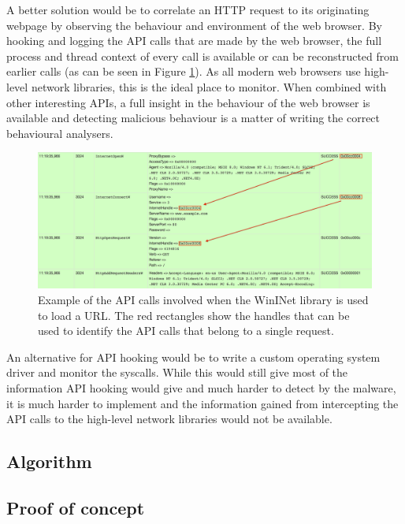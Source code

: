 A better solution would be to correlate an HTTP request to its originating webpage by observing the behaviour and environment of the web browser. By hooking and logging the API calls that are made by the web browser, the full process and thread context of every call is available or can be reconstructed from earlier calls (as can be seen in Figure \ref{fig:wininet}). As all modern web browsers use high-level network libraries, this is the ideal place to monitor. When combined with other interesting APIs, a full insight in the behaviour of the web browser is available and detecting malicious behaviour is a matter of writing the correct behavioural analysers.
\begin{figure}[h]
    \centering
    \includegraphics[width=14.7cm]{Images/wininet.png}
    \caption{Example of the API calls involved when the WinINet library is used to load a URL. The red rectangles show the handles that can be used to identify the API calls that belong to a single request.}
    \label{fig:wininet}
\end{figure}

An alternative for API hooking would be to write a custom operating system driver and monitor the syscalls. While this would still give most of the information API hooking would give and much harder to detect by the malware, it is much harder to implement and the information gained from intercepting the API calls to the high-level network libraries would not be available.

\subsection{Algorithm}


\subsection{Proof of concept}

